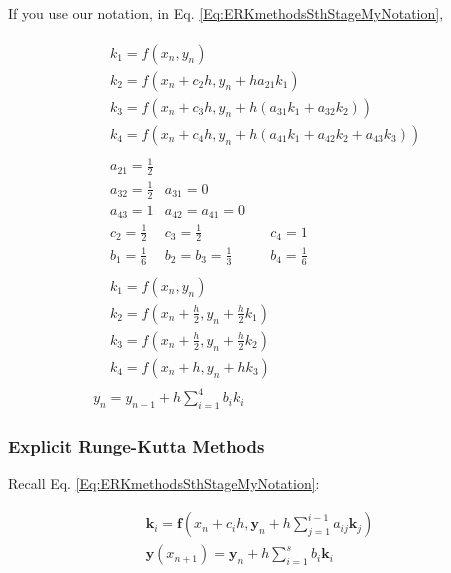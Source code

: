 \documentclass[10pt]{amsart}
\begin{document}
\begin{multicols*}{2}
If you use our notation, in Eq. \ref{Eq:ERKmethodsSthStageMyNotation}, 

\begin{equation}
\begin{gathered}
	\begin{aligned}
		& k_1 = f(x_n, y_n) \\
		& k_2 = f(x_n + c_2h, y_n + ha_{21}k_1) \\
		& k_3 = f(x_n + c_3h , y_n + h (a_{31} k_1+ a_{32}k_2)) \\
		& k_4 = f(x_n + c_4h, y_n + h(a_{41} k_1 + a_{42} k_2 + a_{43}k_3))
	\end{aligned} \\
\begin{aligned}
	& a_{21} = \frac{1}{2} & & \\
	& a_{32} = \frac{1}{2} & a_{31} = 0 & \\
	& a_{43} = 1 & a_{42} = a_{41} = 0 & \\
	& c_2 = \frac{1}{2} & c_3 = \frac{1}{2} & \quad c_4 = 1 \\ 
	& b_1 = \frac{1}{6} & b_2 = b_3 = \frac{1}{3} & \quad b_4 = \frac{1}{6}
\end{aligned} \\
\begin{aligned}
	& k_1 = f(x_n, y_n) \\
	& k_2 = f(x_n + \frac{h}{2}, y_n + \frac{h}{2} k_1) \\
	& k_3 = f(x_n + \frac{h}{2}, y_n + \frac{h}{2} k_2) \\
	& k_4 = f(x_n + h, y_n + hk_3)
\end{aligned} \\
y_n = y_{n-1} + h \sum_{i=1}^4 b_i k_i
\end{gathered}
\end{equation}

\subsubsection{Explicit Runge-Kutta Methods}

Recall Eq. \ref{Eq:ERKmethodsSthStageMyNotation}:

\begin{equation}
	\begin{gathered}
		\mathbf{k}_i = \mathbf{f}(x_n + c_i h, \mathbf{y}_n + h\sum_{j=1}^{i-1} a_{ij} \mathbf{k}_j) \\
		\mathbf{y}(x_{n+1}) = \mathbf{y}_n + h \sum_{i=1}^s b_i \mathbf{k}_i
	\end{gathered}
\end{equation}


\end{multicols*}
\end{document}
